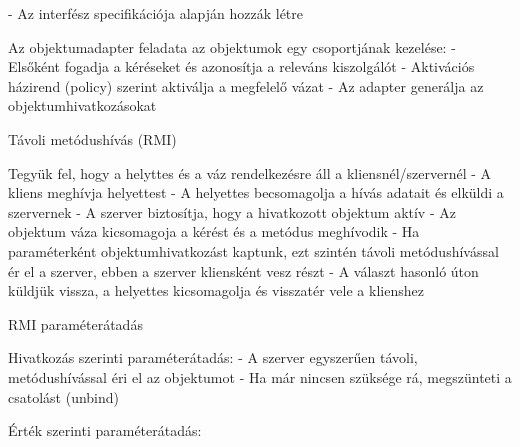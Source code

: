 \documentclass[twoside, a4paper, 12pt]{article}
\begin{document}
\begin{description}
                                                                        - Az interfész specifikációja alapján hozzák létre
                                                                    \item Az objektumadapter feladata az objektumok egy csoportjának kezelése:
                                                                        - Elsőként fogadja a kéréseket és azonosítja a releváns kiszolgálót
                                                                        - Aktivációs házirend (policy) szerint aktiválja  a megfelelő vázat
                                                                        - Az adapter generálja az objektumhivatkozásokat 
                                                                    \item  Távoli metódushívás (RMI)
                                                                    \item Tegyük fel, hogy a helyttes és a váz rendelkezésre áll a kliensnél/szervernél
                                                                        - A kliens meghívja helyettest
                                                                        - A helyettes becsomagolja a hívás adatait és elküldi a szervernek
                                                                        - A szerver biztosítja, hogy a hivatkozott objektum aktív
                                                                        - Az objektum váza kicsomagoja a kérést és a metódus meghívodik
                                                                        - Ha paraméterként objektumhivatkozást kaptunk, ezt szintén távoli metódushívással ér el a szerver,
                                                                        ebben a szerver kliensként vesz részt
                                                                        - A választ hasonló úton küldjük vissza, a helyettes kicsomagolja és visszatér vele a klienshez
                                                                    \item  RMI paraméterátadás
                                                                    \item Hivatkozás szerinti paraméterátadás:
                                                                        - A szerver egyszerűen távoli, metódushívással éri el az objektumot
                                                                        - Ha már nincsen szüksége rá, megszünteti a csatolást (unbind)
                                                                    \item Érték szerinti paraméterátadás: 

\end{description}
\end{document}
